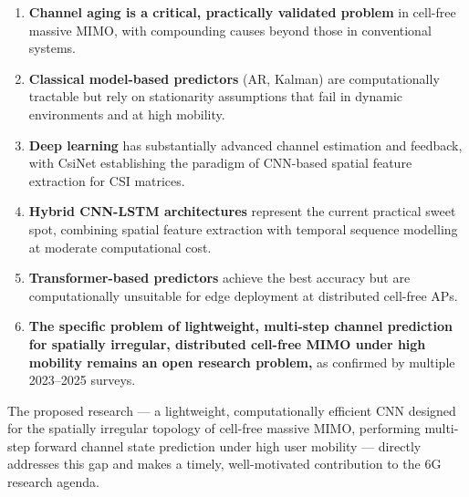 \documentclass[12pt,a4paper]{article}
\begin{document}
\begin{enumerate}
  \item \textbf{Channel aging is a critical, practically validated
        problem} in cell-free massive MIMO, with compounding causes
        beyond those in conventional systems.

  \item \textbf{Classical model-based predictors} (AR, Kalman) are
        computationally tractable but rely on stationarity assumptions
        that fail in dynamic environments and at high mobility.

  \item \textbf{Deep learning} has substantially advanced channel
        estimation and feedback, with CsiNet establishing the paradigm
        of CNN-based spatial feature extraction for CSI matrices.

  \item \textbf{Hybrid CNN-LSTM architectures} represent the current
        practical sweet spot, combining spatial feature extraction with
        temporal sequence modelling at moderate computational cost.

  \item \textbf{Transformer-based predictors} achieve the best accuracy
        but are computationally unsuitable for edge deployment at
        distributed cell-free APs.

  \item \textbf{The specific problem of lightweight, multi-step channel
        prediction for spatially irregular, distributed cell-free MIMO
        under high mobility remains an open research problem,} as
        confirmed by multiple 2023--2025 surveys.
\end{enumerate}

The proposed research --- a lightweight, computationally efficient CNN
designed for the spatially irregular topology of cell-free massive MIMO,
performing multi-step forward channel state prediction under high user
mobility --- directly addresses this gap and makes a timely,
well-motivated contribution to the 6G research agenda.

\newpage


\end{document}

